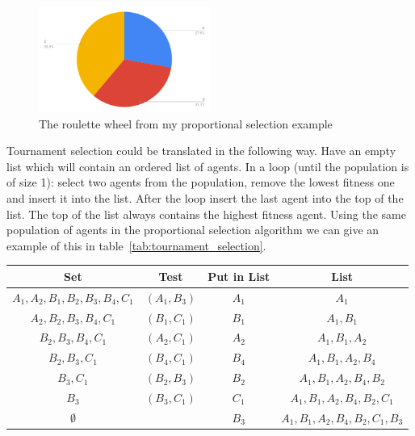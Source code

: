\documentclass[]{final_report}
\begin{document}
\begin{figure}
	\begin{center}
	\includegraphics[width=0.5\textwidth]{reproduction_chart.png}
	\caption{The roulette wheel from my proportional selection example}
	\label{fig:roulette_wheel}
	\end{center}
\end{figure}
Tournament selection could be translated in the following way. Have an empty list which will contain an ordered list of agents. In a loop (until the population is of size 1): select two agents from the population, remove the lowest fitness one and insert it into the list. After the loop insert the last agent into the top of the list. The top of the list always contains the highest fitness agent. Using the same population of agents in the proportional selection algorithm we can give an example of this in table~\ref{tab:tournament_selection}.
\begin{framed}
	\begin{center}
		\begin{tabular}{c|c|c|c}
		Set & Test & Put in List & List\\
		\hline
		${A_1, A_2, B_1, B_2, B_3, B_4, C_1}$ & $(A_1, B_3)$ & $A_1$ & ${A_1}$ \\
		${A_2, B_2, B_3, B_4, C_1}$ & $(B_1, C_1)$ & $B_1$ & ${A_1, B_1}$\\
		${B_2, B_3, B_4, C_1}$ & $(A_2, C_1)$ & $A_2$ & ${A_1, B_1, A_2}$\\
		${B_2, B_3, C_1}$ & $(B_4, C_1)$ & $B_4$ & ${A_1, B_1, A_2, B_4}$\\
		${B_3, C_1}$ & $(B_2, B_3)$ & $B_2$ & ${A_1, B_1, A_2, B_4, B_2}$\\
		${B_3}$ & $(B_3, C_1)$ & $C_1$ & ${A_1, B_1, A_2, B_4, B_2, C_1}$\\
		$\emptyset$	& & $B_3$ & ${A_1, B_1, A_2, B_4, B_2, C_1, B_3}$
		\end{tabular}
		\label{tab:tournament_selection}
	\end{center}	
\end{framed}
\end{document}

